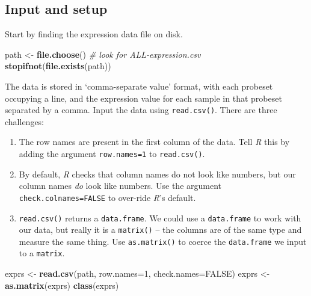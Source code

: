 \documentclass[]{article}
\newenvironment{Shaded}{\begin{snugshade}}{\end{snugshade}}
\newcommand{\KeywordTok}[1]{\textcolor[rgb]{0.13,0.29,0.53}{\textbf{#1}}}
\newcommand{\DataTypeTok}[1]{\textcolor[rgb]{0.13,0.29,0.53}{#1}}
\newcommand{\DecValTok}[1]{\textcolor[rgb]{0.00,0.00,0.81}{#1}}
\newcommand{\StringTok}[1]{\textcolor[rgb]{0.31,0.60,0.02}{#1}}
\newcommand{\CommentTok}[1]{\textcolor[rgb]{0.56,0.35,0.01}{\textit{#1}}}
\newcommand{\OtherTok}[1]{\textcolor[rgb]{0.56,0.35,0.01}{#1}}
\newcommand{\NormalTok}[1]{#1}
\providecommand{\tightlist}{%
  \setlength{\itemsep}{0pt}\setlength{\parskip}{0pt}}
\theoremstyle{definition}
\theoremstyle{definition}
\theoremstyle{remark}
\begin{document}
\subsection{Input and setup}\label{input-and-setup}

Start by finding the expression data file on disk.

\begin{Shaded}
\begin{Highlighting}[]
\NormalTok{path <-}\StringTok{ }\KeywordTok{file.choose}\NormalTok{()          }\CommentTok{# look for ALL-expression.csv}
\KeywordTok{stopifnot}\NormalTok{(}\KeywordTok{file.exists}\NormalTok{(path))}
\end{Highlighting}
\end{Shaded}

The data is stored in `comma-separate value' format, with each probeset
occupying a line, and the expression value for each sample in that
probeset separated by a comma. Input the data using \texttt{read.csv()}.
There are three challenges:

\begin{enumerate}
\def\labelenumi{\arabic{enumi}.}
\tightlist
\item
  The row names are present in the first column of the data. Tell
  \emph{R} this by adding the argument \texttt{row.names=1} to
  \texttt{read.csv()}.
\item
  By default, \emph{R} checks that column names do not look like
  numbers, but our column names \emph{do} look like numbers. Use the
  argument \texttt{check.colnames=FALSE} to over-ride \emph{R}'s
  default.
\item
  \texttt{read.csv()} returns a \texttt{data.frame}. We could use a
  \texttt{data.frame} to work with our data, but really it is a
  \texttt{matrix()} -- the columns are of the same type and measure the
  same thing. Use \texttt{as.matrix()} to coerce the \texttt{data.frame}
  we input to a \texttt{matrix}.
\end{enumerate}

\begin{Shaded}
\begin{Highlighting}[]
\NormalTok{exprs <-}\StringTok{ }\KeywordTok{read.csv}\NormalTok{(path, }\DataTypeTok{row.names=}\DecValTok{1}\NormalTok{, }\DataTypeTok{check.names=}\OtherTok{FALSE}\NormalTok{)}
\NormalTok{exprs <-}\StringTok{ }\KeywordTok{as.matrix}\NormalTok{(exprs)}
\KeywordTok{class}\NormalTok{(exprs)}
\end{Highlighting}
\end{Shaded}
\end{document}
